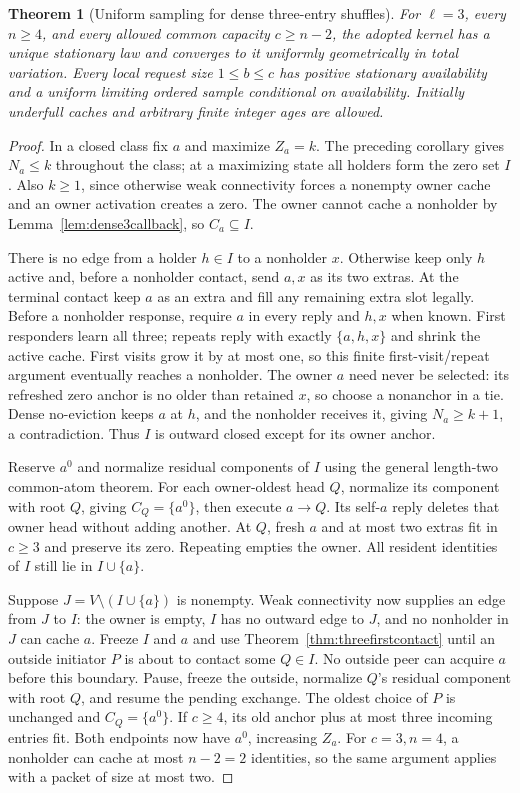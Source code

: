 \documentclass[11pt]{article}
\newtheorem{theorem}{Theorem}
\begin{document}
\begin{theorem}[Uniform sampling for dense three-entry shuffles]
\label{thm:dense3uniform}
For $\ell=3$, every $n\ge4$, and every allowed common capacity
$c\ge n-2$, the adopted kernel has a unique stationary law
and converges to it uniformly geometrically in total variation.
Every local request size $1\le b\le c$ has positive stationary
availability and a uniform limiting ordered sample conditional
on availability. Initially underfull caches and arbitrary finite
integer ages are allowed.
\end{theorem}
\begin{proof}
In a closed class fix $a$ and maximize $Z_a=k$.
The preceding corollary gives $N_a\le k$ throughout the class;
at a maximizing state all holders form the zero set $I$.
Also $k\ge1$, since otherwise weak connectivity forces a
nonempty owner cache and an owner activation creates a zero.
The owner cannot cache a nonholder by
Lemma~\ref{lem:dense3callback}, so $C_a\subseteq I$.

There is no edge from a holder $h\in I$ to a nonholder $x$.
Otherwise keep only $h$ active and, before a nonholder contact,
send $a,x$ as its two extras. At the terminal contact keep
$a$ as an extra and fill any remaining extra slot legally.
Before a nonholder response, require $a$ in every
reply and $h,x$ when known. First responders learn all three;
repeats reply with exactly $\{a,h,x\}$ and shrink the active
cache. First visits grow it by at most one, so this finite
first-visit/repeat argument eventually reaches a nonholder.
The owner $a$ need never be selected: its refreshed zero
anchor is no older than retained $x$, so choose a nonanchor
in a tie. Dense no-eviction keeps $a$ at $h$, and the
nonholder receives it, giving $N_a\ge k+1$, a contradiction.
Thus $I$ is outward closed except for its owner anchor.

Reserve $a^0$ and normalize residual components of $I$ using
the general length-two common-atom theorem.
For each owner-oldest head $Q$, normalize its component
with root $Q$, giving $C_Q=\{a^0\}$, then execute $a\to Q$.
Its self-$a$ reply deletes that owner head without adding
another. At $Q$, fresh $a$ and at most two extras fit in
$c\ge3$ and preserve its zero. Repeating empties the owner.
All resident identities of $I$ still lie in $I\cup\{a\}$.

Suppose $J=V\setminus(I\cup\{a\})$ is nonempty.
Weak connectivity now supplies an edge from $J$ to $I$:
the owner is empty, $I$ has no outward edge to $J$,
and no nonholder in $J$ can cache $a$.
Freeze $I$ and $a$ and use Theorem~\ref{thm:threefirstcontact}
until an outside initiator $P$ is about to contact some $Q\in I$.
No outside peer can acquire $a$ before this boundary.
Pause, freeze the outside, normalize $Q$'s residual component
with root $Q$, and resume the pending exchange.
The oldest choice of $P$ is unchanged and $C_Q=\{a^0\}$.
If $c\ge4$, its old anchor plus at most three incoming
entries fit. Both endpoints now have $a^0$, increasing $Z_a$.
For $c=3,n=4$, a nonholder can cache at most $n-2=2$
identities, so the same argument applies with a packet of
size at most two.


\end{proof}
\end{document}
